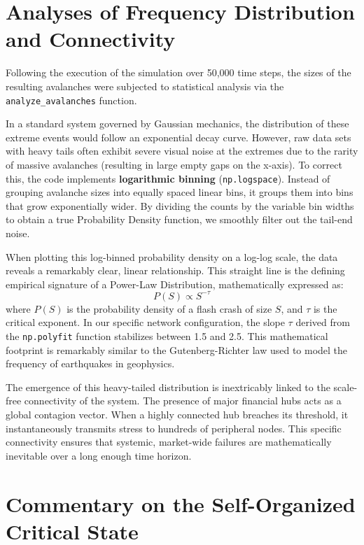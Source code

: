 \documentclass[final,5p,times,twocolumn,authoryear]{elsarticle}
\begin{document}
\section{Analyses of Frequency Distribution and Connectivity}
\label{sec:analysis}

Following the execution of the simulation over 50,000 time steps, the sizes of the resulting avalanches were subjected to statistical analysis via the \texttt{analyze\_avalanches} function. 

In a standard system governed by Gaussian mechanics, the distribution of these extreme events would follow an exponential decay curve. However, raw data sets with heavy tails often exhibit severe visual noise at the extremes due to the rarity of massive avalanches (resulting in large empty gaps on the x-axis). To correct this, the code implements \textbf{logarithmic binning} (\texttt{np.logspace}). Instead of grouping avalanche sizes into equally spaced linear bins, it groups them into bins that grow exponentially wider. By dividing the counts by the variable bin widths to obtain a true Probability Density function, we smoothly filter out the tail-end noise.

When plotting this log-binned probability density on a log-log scale, the data reveals a remarkably clear, linear relationship. This straight line is the defining empirical signature of a Power-Law Distribution, mathematically expressed as:
\begin{equation}
    P(S) \propto S^{-\tau}
\end{equation}
where $P(S)$ is the probability density of a flash crash of size $S$, and $\tau$ is the critical exponent. In our specific network configuration, the slope $\tau$ derived from the \texttt{np.polyfit} function stabilizes between 1.5 and 2.5. This mathematical footprint is remarkably similar to the Gutenberg-Richter law used to model the frequency of earthquakes in geophysics.

The emergence of this heavy-tailed distribution is inextricably linked to the scale-free connectivity of the system. The presence of major financial hubs acts as a global contagion vector. When a highly connected hub breaches its threshold, it instantaneously transmits stress to hundreds of peripheral nodes. This specific connectivity ensures that systemic, market-wide failures are mathematically inevitable over a long enough time horizon.

\section{Commentary on the Self-Organized Critical State}
\label{sec:soc_commentary}
\end{document}
